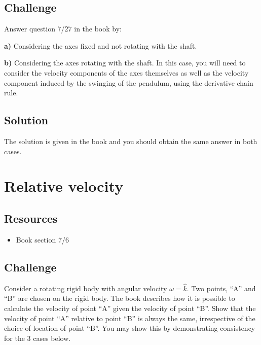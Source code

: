 \subsection*{Challenge}
Answer question 7/27 in the book by:

\textbf{a)} Considering the axes fixed and not rotating with the shaft.

\textbf{b)} Considering the axes rotating with the shaft. In this case, you will need to consider the velocity components of the axes themselves as well as the velocity component induced by the swinging of the pendulum, using the derivative chain rule.

\subsection*{Solution}
The solution is given in the book and you should obtain the same answer in both cases.




%
%




\newpage
\section{Relative velocity}

\subsection*{Resources}
\begin{itemize}
    \item Book section 7/6
\end{itemize}

\subsection*{Challenge}
Consider a rotating rigid body with angular velocity $\omega=\hat{k}$. Two points, ``A'' and ``B'' are chosen on the rigid body. The book describes how it is possible to calculate the velocity of point ``A'' given the velocity of point ``B''. Show that the velocity of point ``A'' relative to point ``B'' is always the same, irrespective of the choice of location of point ``B''. You may show this by demonstrating consistency for the 3 cases below.

